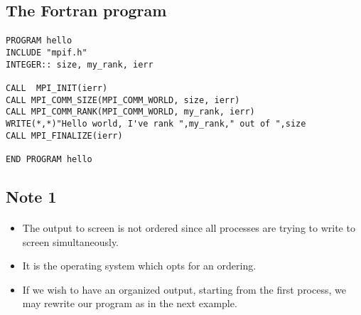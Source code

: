 \subsection*{The Fortran program}

\paragraph{}












\begin{Verbatim}[numbers=none,fontsize=\fontsize{9pt}{9pt},baselinestretch=0.95]
PROGRAM hello
INCLUDE "mpif.h"
INTEGER:: size, my_rank, ierr

CALL  MPI_INIT(ierr)
CALL MPI_COMM_SIZE(MPI_COMM_WORLD, size, ierr)
CALL MPI_COMM_RANK(MPI_COMM_WORLD, my_rank, ierr)
WRITE(*,*)"Hello world, I've rank ",my_rank," out of ",size
CALL MPI_FINALIZE(ierr)

END PROGRAM hello

\end{Verbatim}



\subsection*{Note 1}

\paragraph{}

\begin{itemize}
\item The output to screen is not ordered since all processes are trying to write  to screen simultaneously.

\item It is the operating system which opts for an ordering.  

\item If we wish to have an organized output, starting from the first process, we may rewrite our program as in the next example.
\end{itemize}

\noindent



